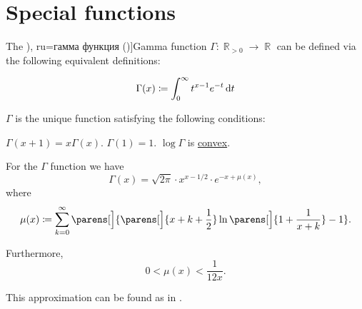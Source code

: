 \section{Special functions}\label{sec:special_functions}

\begin{definition}\label{def:gamma_function}
  The \term[bg=гама (функция) (\cite[280]{Тагамлицки1978ИнтегралноСмятане}), ru=гамма функция (\cite[406]{Зорич2019АнализЧасть2})]{Gamma function} \( \Gamma: \BbbR_{>0} \to \BbbR \) can be defined via the following equivalent definitions:
  \begin{thmenum}
    \begin{equation}\label{eq:def:gamma_function/direct}
      \Gamma(x) \coloneqq \int_0^\infty t^{x-1} e^{-t} \dl t
    \end{equation}

     \( \Gamma \) is the unique function satisfying the following conditions:
    \begin{thmenum}
       \( \Gamma(x + 1) = x \Gamma(x) \).
       \( \Gamma(1) = 1 \).
       \( \log \Gamma \) is \hyperref[def:convex_function]{convex}.
    \end{thmenum}
  \end{thmenum}
\end{definition}

\begin{theorem}\label{thm:stirlings_gamma_approximation}
  For the \( \Gamma \) function we have
  \begin{equation}\label{eq:thm:stirlings_gamma_approximation}
    \Gamma(x) = \sqrt{2 \pi} \cdot x^{x - 1 / 2} \cdot e^{-x + \mu(x)},
  \end{equation}
  where
  \begin{equation}\label{eq:thm:stirlings_gamma_approximation/mu}
    \mu(x) \coloneqq \sum_{k=0}^\infty \parens[\Big]{ \parens[\Big]{ x + k + \frac 1 2 } \ln\parens[\Big]{ 1 + \frac 1 {x + k} } - 1 }.
  \end{equation}

  Furthermore,
  \begin{equation}\label{eq:thm:stirlings_gamma_approximation/mu_inequality}
    0 < \mu(x) < \frac 1 {12x}.
  \end{equation}
\end{theorem}
\begin{comments}
  \item This approximation can be found as  in \cite{notebook:code}.
\end{comments}
